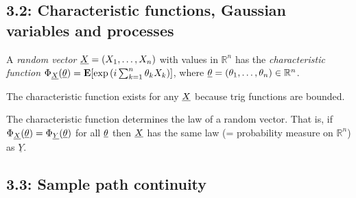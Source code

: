 
\subsection*{3.2: Characteristic functions, Gaussian variables and processes}
\begin{definition*}
A \emph{random vector} ${\underline{X}} = (X_1,\dots,X_n)$ with values in $\mathbb R^n$ has the \emph{characteristic function} 
$\Phi_{{\underline{X}}}(\underline{\theta}) = \mathbf{E}[\exp{(i \sum_{k=1}^n \theta_k X_k)}]$, 
where $\underline{\theta} = (\theta_1,\dots,\theta_n) \in \mathbb R^n$.
\end{definition*}

\begin{remark*}
The characteristic function exists for any ${\underline{X}}$ because trig functions are bounded.
\end{remark*}

\begin{proposition*}
The characteristic function determines the law of a random vector. That is, if $\Phi_{\underline{X}}(\underline{\theta}) = \Phi_{\underline{Y}}(\underline{\theta})$ for all $\underline{\theta}$ then ${\underline{X}}$ has the same law (= probability measure on $\mathbb R^n$) as $\underline Y$.
\end{proposition*}

\subsection*{3.3: Sample path continuity}

